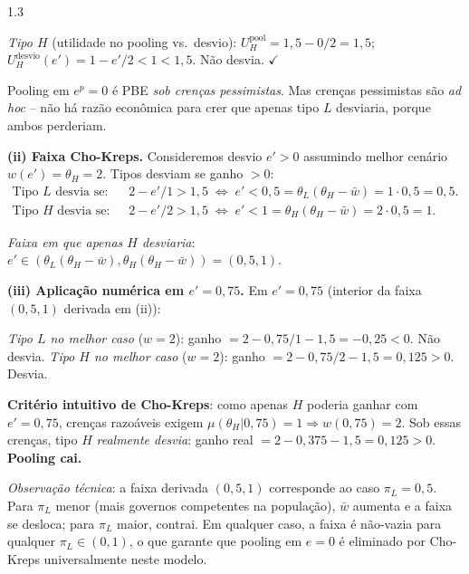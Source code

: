 \documentclass[11pt,addpoints]{exam}
\begin{document}
\begin{spacing}{1.3}
\begin{questions}
\begin{parts}
\begin{solution}
\emph{Tipo $H$} (utilidade no pooling vs.\ desvio): $U_H^{\text{pool}} = 1{,}5 - 0/2 = 1{,}5$; $U_H^{\text{desvio}}(e') = 1 - e'/2 < 1 < 1{,}5$. Não desvia. $\checkmark$

Pooling em $e^p = 0$ é PBE \emph{sob crenças pessimistas}. Mas crenças pessimistas são \emph{ad hoc} -- não há razão econômica para crer que apenas tipo $L$ desviaria, porque ambos perderiam.

\textbf{(ii) Faixa Cho-Kreps.} Consideremos desvio $e' > 0$ assumindo melhor cenário $w(e') = \theta_H = 2$. Tipos desviam se ganho $> 0$:
\begin{align*}
    \text{Tipo $L$ desvia se}:\quad & 2 - e'/1 > 1{,}5 \;\Longleftrightarrow\; e' < 0{,}5 = \theta_L(\theta_H - \bar w) = 1\cdot 0{,}5 = 0{,}5. \\
    \text{Tipo $H$ desvia se}:\quad & 2 - e'/2 > 1{,}5 \;\Longleftrightarrow\; e' < 1 = \theta_H(\theta_H - \bar w) = 2\cdot 0{,}5 = 1.
\end{align*}

\emph{Faixa em que apenas $H$ desviaria}: $e' \in (\theta_L(\theta_H - \bar w), \theta_H(\theta_H - \bar w)) = (0{,}5, 1)$.

\textbf{(iii) Aplicação numérica em $e' = 0{,}75$.} Em $e' = 0{,}75$ (interior da faixa $(0{,}5, 1)$ derivada em (ii)):

\emph{Tipo $L$ no melhor caso} ($w = 2$): ganho $= 2 - 0{,}75/1 - 1{,}5 = -0{,}25 < 0$. Não desvia.
\emph{Tipo $H$ no melhor caso} ($w = 2$): ganho $= 2 - 0{,}75/2 - 1{,}5 = 0{,}125 > 0$. Desvia.

\textbf{Critério intuitivo de Cho-Kreps}: como apenas $H$ poderia ganhar com $e' = 0{,}75$, crenças razoáveis exigem $\mu(\theta_H | 0{,}75) = 1 \Rightarrow w(0{,}75) = 2$. Sob essas crenças, tipo $H$ \emph{realmente desvia}: ganho real $= 2 - 0{,}375 - 1{,}5 = 0{,}125 > 0$. \textbf{Pooling cai.}

\emph{Observação técnica}: a faixa derivada $(0{,}5, 1)$ corresponde ao caso $\pi_L = 0{,}5$. Para $\pi_L$ menor (mais governos competentes na população), $\bar w$ aumenta e a faixa se desloca; para $\pi_L$ maior, contrai. Em qualquer caso, a faixa é não-vazia para qualquer $\pi_L \in (0, 1)$, o que garante que pooling em $e = 0$ é eliminado por Cho-Kreps universalmente neste modelo.


\end{solution}
\end{parts}
\end{questions}
\end{spacing}
\end{document}
